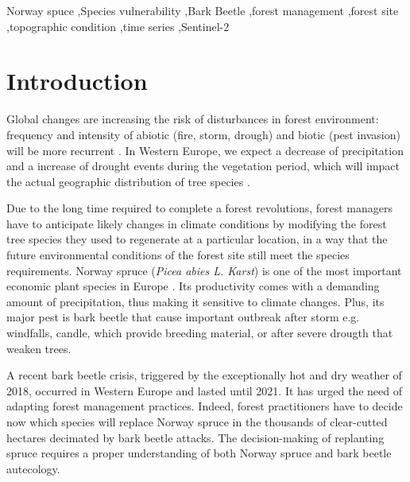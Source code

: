 \documentclass[3p,procedia]{elsarticle}
\begin{document}
\begin{frontmatter}
\begin{abstract}
\fi
\end{abstract}

\begin{keyword}
  Norway spuce \sep Species vulnerability \sep Bark Beetle \sep forest management \sep forest site \sep topographic condition \sep time series \sep Sentinel-2
\end{keyword}

\end{frontmatter}

\linenumbers

\section{Introduction}

Global changes are increasing the risk of disturbances in forest environment: frequency and intensity of abiotic (fire, storm, drough) and biotic (pest invasion) will be more recurrent \citep{lindner_climate_2010}.
In Western Europe, we expect a decrease of precipitation and a increase of drought events during the vegetation period, which will impact the actual geographic distribution of tree species \citep{hanewinkel2013climate}.

Due to the long time required to complete a forest revolutions, forest managers have to anticipate likely changes in climate conditions by modifying the forest tree species they used to regenerate at a particular location, in a way that the future environmental conditions of the forest site still meet the species requirements.
Norway spruce (\textit{Picea abies L. Karst}) is one of the most important economic plant species in Europe \citep{nystedt_norway_2013}.
Its productivity comes with a demanding amount of precipitation, thus making it sensitive to climate changes.
Plus, its major pest is bark beetle that cause important outbreak after storm e.g. windfalls, candle, which provide breeding material, or after severe drougth that weaken trees.

A recent bark beetle crisis, triggered by the exceptionally hot and dry weather of 2018, occurred in Western Europe and lasted until 2021. 
It has urged the need of adapting forest management practices. 
Indeed, forest practitioners have to decide now which species will replace Norway spruce in the thousands of clear-cutted hectares decimated by bark beetle attacks. 
The decision-making of replanting spruce requires a proper understanding of both Norway spruce and bark beetle autecology.
\end{document}
